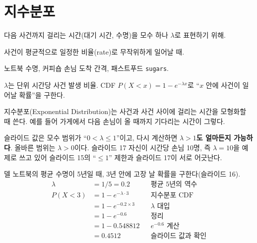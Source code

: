 \section{지수분포}
\label{sec:exponential}

\begin{inbrief}
  \item[Why] 다음 사건까지 걸리는 시간(대기 시간, 수명)을 모수 하나
             $\lambda$로 표현하기 위해.
  \item[When] 사건이 평균적으로 일정한 비율(rate)로 무작위하게 일어날 때.
  \item[Where] 노트북 수명, 커피숍 손님 도착 간격, 패스트푸드
               \texttt{sugars}.
  \item[How] $\lambda$는 단위 시간당 사건 발생 비율. CDF
             $P(X<x) = 1 - e^{-\lambda x}$로 ``$x$ 안에 사건이 일어날
             확률''을 구한다.
\end{inbrief}

지수분포(Exponential Distribution)는 사건과 사건 사이에 걸리는 시간을
모형화할 때 쓴다. 예를 들어 가게에서 다음 손님이 올 때까지 기다리는
시간이 그렇다.

\begin{pitfall}[모수 범위]
슬라이드 값은 모수 범위가 ``$0 < \lambda \le 1$''이고, 다시 계산하면
\textbf{$\lambda > 1$도 얼마든지 가능하다}. 올바른 범위는 $\lambda > 0$이다. 슬라이드 17
자신이 시간당 손님 10명, 즉 $\lambda = 10$을 예제로 쓰고 있어 슬라이드
15의 ``$\le 1$'' 제한과 슬라이드 17이 서로 어긋난다.
\end{pitfall}

\begin{example}[노트북 수명]
\label{ex:dist-laptop}
델 노트북의 평균 수명이 5년일 때, 3년 안에 고장 날 확률을 구한다(슬라이드
16).
\begin{align*}
  \lambda &= 1/5 = 0.2      && \text{평균 5년의 역수}\\
  P(X<3) &= 1 - e^{-\lambda \cdot 3}  && \text{지수분포 CDF}\\
         &= 1 - e^{-0.2\times 3} && \text{$\lambda$ 대입}\\
         &= 1 - e^{-0.6}   && \text{정리}\\
         &= 1 - 0.548812   && \text{$e^{-0.6}$ 계산}\\
         &= \mathbf{0.4512} && \text{슬라이드 값과 확인}
\end{align*}
\end{example}

